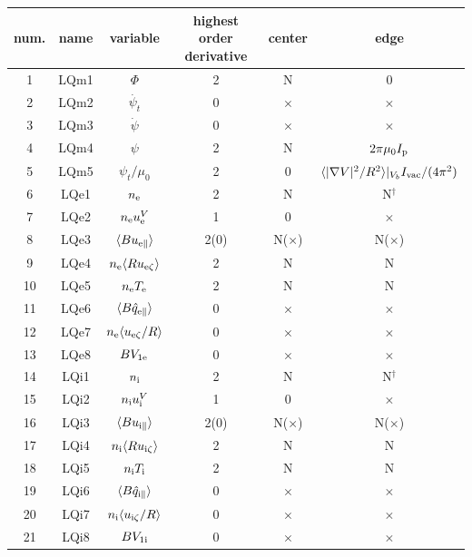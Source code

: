 \documentclass[11pt]{article}
\def\r#1{{\rm#1}}
\def\aves#1{\langle#1\rangle}
\def\para{\parallel}
\def\psid{\dot{\psi}}
\def\psit{\psi_t}
\def\psitd{\dot{\psit}}
\def\nee{n_\r{e}}
\def\ni{n_\r{i}}
\def\Te{T_\r{e}}
\def\Ti{T_\r{i}}
\def\uzt#1{u_{\r{#1}\zeta}}
\def\upara#1{u_{\r{#1}\para}}
\def\qhatpara#1{\hat{q}_{\r{#1}\para}}
\def\uV#1{u_\r{#1}^V}
\begin{document}
%
\begin{tabular}{|c|c|c|c|c|c|}\hline
 num. & name & variable               & \shortstack{highest order\\ derivative} & center & edge \\\hline
 1    & LQm1 & $\Phi$                 & 2    &  N           & 0\\
 2    & LQm2 & $\psitd$               & 0    &  $\times$    & $\times$\\
 3    & LQm3 & $\psid$                & 0    &  $\times$    & $\times$\\
 4    & LQm4 & $\psi$                 & 2    &  N           & $2\pi\mu_0I_\r{p}$\\
 5    & LQm5 & $\psit/\mu_0$          & 2    &  0           & $\aves{|\nabla V|^2/R^2}|_{V_b}I_\r{vac}/(4\pi^2)$\\
 6    & LQe1 & $\nee$                 & 2    &  N           & N$^\dagger$\\
 7    & LQe2 & $\nee\uV{e}$           & 1    &  0           & $\times$\\
 8    & LQe3 & $\aves{B\upara{e}}$    & 2(0) &  N($\times$) & N($\times$)\\
 9    & LQe4 & $\nee\aves{R\uzt{e}}$  & 2    &  N           & N\\
 10   & LQe5 & $\nee \Te$             & 2    &  N           & N\\
 11   & LQe6 & $\aves{B\qhatpara{e}}$ & 0    &  $\times$    & $\times$\\
 12   & LQe7 & $\nee\aves{\uzt{e}/R}$ & 0    &  $\times$    & $\times$\\
 13   & LQe8 & $B V_{1\r{e}}$         & 0    &  $\times$    & $\times$\\
 14   & LQi1 & $\ni$                  & 2    &  N           & N$^\dagger$\\
 15   & LQi2 & $\ni\uV{i}$            & 1    &  0           & $\times$\\
 16   & LQi3 & $\aves{B\upara{i}}$    & 2(0) &  N($\times$) & N($\times$)\\
 17   & LQi4 & $\ni\aves{R\uzt{i}}$   & 2    &  N           & N\\
 18   & LQi5 & $\ni \Ti$              & 2    &  N           & N\\
 19   & LQi6 & $\aves{B\qhatpara{i}}$ & 0    &  $\times$    & $\times$\\
 20   & LQi7 & $\ni\aves{\uzt{i}/R}$  & 0    &  $\times$    & $\times$\\
 21   & LQi8 & $B V_{1\r{i}}$         & 0    &  $\times$    & $\times$\\

\end{tabular}
\end{document}
